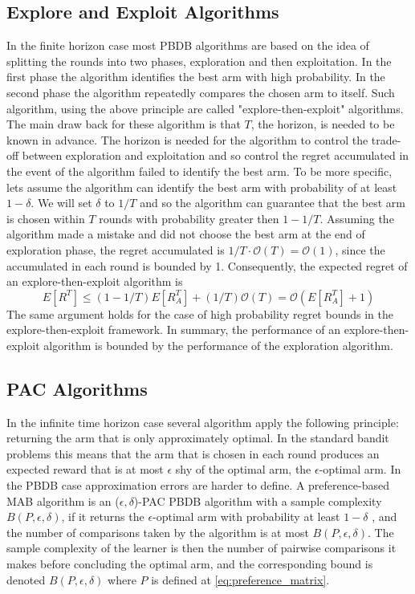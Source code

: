 \documentclass{llncs}
\begin{document}
\subsection{Explore and Exploit Algorithms}
	In the finite horizon case most PBDB algorithms are based on the idea of splitting the rounds into two phases, exploration and then exploitation. In the first phase the algorithm identifies the best arm with high probability. In the second phase the algorithm repeatedly compares the chosen arm to itself.
	Such algorithm, using the above principle are called "explore-then-exploit" algorithms.
	The main draw back for these algorithm is that $T$, the horizon, is needed to be known in advance. The horizon is needed for the algorithm to control the trade-off between exploration and exploitation and so control the regret accumulated in the event of the algorithm failed to identify the best arm.
	To be more specific, lets assume the algorithm can identify the best arm with probability of at least $1-\delta$. We will set $\delta$ to $1/T$ and so the algorithm can guarantee that the best arm is chosen within $T$ rounds with probability greater then $1-1/T$.
	Assuming the algorithm made a mistake and did not choose the best arm at the end of exploration phase, the regret accumulated is $1/T\cdot \mathcal{O}(T) = \mathcal{O}(1)$, since the accumulated in each round is bounded by 1.
	Consequently, the expected regret of an explore-then-exploit algorithm is
	\begin{equation}
		E[R^T] \leq (1-1/T)E[R^T_A] +(1/T)\mathcal{O}(T) = \mathcal{O}(E[R_A^T]+1)
	\end{equation}
	The same argument holds for the case of high probability regret bounds in the explore-then-exploit framework. 
	In summary, the performance of an explore-then-exploit algorithm is bounded by the performance of the exploration algorithm. 
	
	\subsection{PAC Algorithms}
	In the infinite time horizon case several algorithm apply the following principle: returning the arm that is only approximately optimal.
	In the standard bandit problems this means that the arm that is chosen in each round produces an expected reward that is at most $\epsilon$ shy of the optimal arm, the $\epsilon$-optimal arm.
	In the PBDB case approximation errors are harder to define.  
	A preference-based MAB algorithm is an ($\epsilon, \delta$)-PAC PBDB algorithm with a sample complexity $B(P,\epsilon,\delta)$, if it returns the $\epsilon$-optimal arm with probability at least $1-\delta$ , and the number of comparisons taken by the algorithm is at most $B(P,\epsilon,\delta)$.
	The sample complexity of the learner is then the number of pairwise comparisons it makes before concluding the optimal arm, and the corresponding bound is denoted $B(P,\epsilon,\delta)$ where $P$ is defined at \eqref{eq:preference_matrix}.
\end{document}
